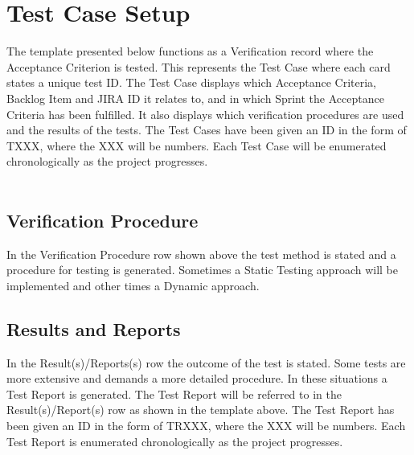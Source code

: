 \newpage

\section{Test Case Setup}
The template presented below functions as a Verification record where the Acceptance Criterion is tested. This represents the Test Case where each card states a unique test ID. The Test Case displays which Acceptance Criteria, Backlog Item and JIRA ID it relates to, and in which Sprint the Acceptance Criteria has been fulfilled. It also displays which verification procedures are used and the results of the tests. The Test Cases have been given an ID in the form of TXXX, where the XXX will be numbers. Each Test Case will be enumerated chronologically as the project progresses. \\
\\
         {}
         {\shortstack[l]{}}
         {}
         {\shortstack[l]{}}

\subsection*{Verification Procedure}
In the Verification Procedure row shown above the test method is stated and a procedure for testing is generated. Sometimes a Static Testing approach will be implemented and other times a Dynamic approach. 
\\
\subsection*{Results and Reports}
In the Result(s)/Reports(s) row the outcome of the test is stated. Some tests are more extensive and demands a more detailed procedure. In these situations a Test Report is generated. The Test Report will be referred to in the Result(s)/Report(s) row as shown in the template above. The Test Report has been given an ID in the form of TRXXX, where the XXX will be numbers. Each Test Report is enumerated chronologically as the project progresses. \\ 
\\

